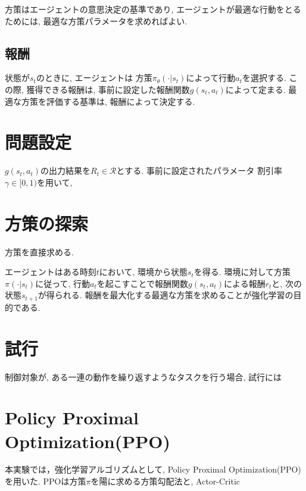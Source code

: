 \documentclass[../main]{subfiles}
\begin{document}
方策はエージェントの意思決定の基準であり, 
エージェントが最適な行動をとるためには, 
最適な方策パラメータを求めればよい.


\subsection{報酬}
状態が$s_t$のときに, エージェントは
方策$\pi_\theta(\cdot|s_t)$によって行動$a_t$を選択する.
この際, 獲得できる報酬は, 
事前に設定した報酬関数$g(s_t, a_t)$によって定まる. 
最適な方策を評価する基準は, 報酬によって決定する.




\section{問題設定}
$g(s_t, a_t)$の出力結果を$R_t \in \mathcal{R}$とする.
事前に設定されたパラメータ
割引率$\gamma \in [0, 1)$を用いて, 

\section{方策の探索}
方策を直接求める.

エージェントはある時刻$t$において, 環境から状態$s_t$を得る.
環境に対して方策$\pi(\cdot|s_t)$に従って, 
行動$a_t$を起こすことで報酬関数$g(s_t,a_t)$による報酬$r_t$と, 
次の状態$s_{t+1}$が得られる. 
報酬を最大化する最適な方策を求めることが強化学習の目的である.


\section{試行}
制御対象が, ある一連の動作を繰り返すようなタスクを行う場合, 
試行には


\section{Policy Proximal Optimization(PPO)}
本実験では，強化学習アルゴリズムとして, 
Policy Proximal Optimization(PPO)
\cite{ref:proximal_policy}を用いた.
PPOは方策$\pi$を陽に求める方策勾配法と, Actor-Critic
\end{document}
